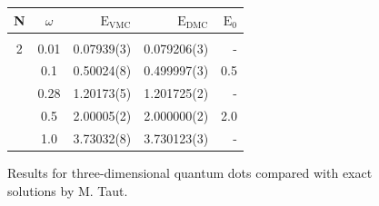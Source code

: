 \begin{frame}

\footnotesize
\begin{figure}
 \begin{center}
 \begin{tabular}{cc|rrr}
    N     & $\omega$ & $\mathrm{E_{VMC}}$ & $\mathrm{E_{DMC}}$ & $\mathrm{E_0}$\\
\hline\hline
\multicolumn{5}{c}{} \\
    2     &   0.01   & 0.07939(3)  & 0.079206(3) & -		\\
          &   0.1    & 0.50024(8)  & 0.499997(3) & 0.5        \\
          &   0.28   & 1.20173(5)  & 1.201725(2) & -		\\
          &   0.5    & 2.00005(2)  & 2.000000(2) & 2.0 \\
          &   1.0    & 3.73032(8)  & 3.730123(3) & - \\
 \end{tabular}  
 \end{center}
  \caption{Results for three-dimensional quantum dots compared with exact solutions by M. Taut.}
\end{figure}
\end{frame}

\normalsize


